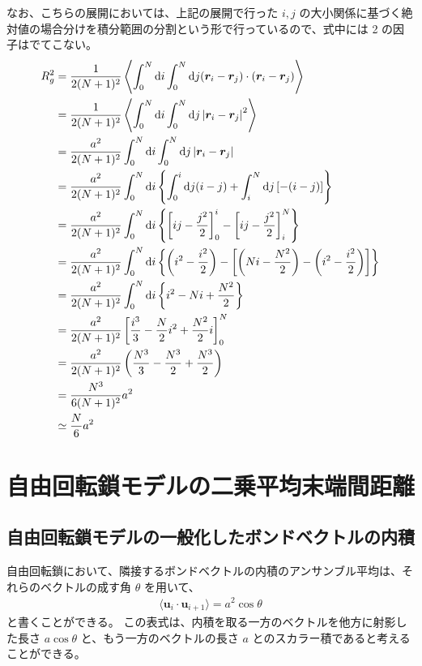 \documentclass[a4paper,11pt]{ltjsarticle}
\begin{document}
\begin{appendix}
なお、こちらの展開においては、上記の展開で行った $i , j$ の大小関係に基づく絶対値の場合分けを積分範囲の分割という形で行っているので、式中には 2 の因子はでてこない。
\begin{align*}
R_g^2 
	&= \dfrac{1}{2(N+1)^2} \left \langle \int_{0}^N \odif{i} \int_{0}^N \odif{j} (\bm{r}_i - \bm{r}_j) \cdot (\bm{r}_i - \bm{r}_j) \right \rangle\\
	&= \dfrac{1}{2(N+1)^2} \left \langle \int_{0}^N \odif{i} \int_{0}^{N} \odif{j} \left|\bm{r}_i - \bm{r}_j \right|^2 \right \rangle\\
	&= \dfrac{a^2}{2(N+1)^2} \int_{0}^N \odif{i} \int_{0}^{N} \odif{j} \left|\bm{r}_i - \bm{r}_j \right| \\
	&= \dfrac{a^2}{2(N+1)^2} \int_{0}^N \odif{i} \left\{ \int_{0}^{i} \odif{j} (i -j) + \int_i^N \odif{j} \left[ -(i-j) \right] \right\} \\
	&= \dfrac{a^2}{2(N+1)^2} \int_{0}^N \odif{i} \left\{ \left [ij - \dfrac{j^2}{2} \right]_0^i - \left[ ij - \dfrac{j^2}{2} \right]_i^N \right\} \\
	&= \dfrac{a^2}{2(N+1)^2} \int_{0}^N \odif{i} \left\{ \left (i^2 - \dfrac{i^2}{2} \right) - \left[ \left(Ni - \dfrac{N^2}{2} \right) - \left (i^2 - \dfrac{i^2}{2} \right) \right] \right\} \\
	&= \dfrac{a^2}{2(N+1)^2} \int_{0}^N \odif{i} \left\{ i^2 - Ni + \dfrac{N^2}{2} \right\} \\
	&= \dfrac{a^2}{2(N+1)^2} \left[ \dfrac{i^3}{3} - \dfrac{N}{2}i^2 + \dfrac{N^2}{2} i \right]_0^N \\
	&= \dfrac{a^2}{2(N+1)^2} \left( \dfrac{N^3}{3} - \dfrac{N^3}{2} + \dfrac{N^3}{2} \right) \\
	&= \dfrac{N^3 }{6(N+1)^2} a^2\\
	&\simeq \dfrac{N}{6} a^2\\
\end{align*}
\newpage

\section{自由回転鎖モデルの二乗平均末端間距離}
\label{sec:1FR_R2}

\subsection{自由回転鎖モデルの一般化したボンドベクトルの内積}

自由回転鎖において、隣接するボンドベクトルの内積のアンサンブル平均は、それらのベクトルの成す角 $\theta$ を用いて、
\begin{align*}
	\langle \bm{u}_i \cdot \bm{u}_{i+1} \rangle = a^2 \cos \theta 
\end{align*} 
と書くことができる。
この表式は、内積を取る一方のベクトルを他方に射影した長さ $a \cos \theta$ と、もう一方のベクトルの長さ $a$ とのスカラー積であると考えることができる。


\end{appendix}
\end{document}
